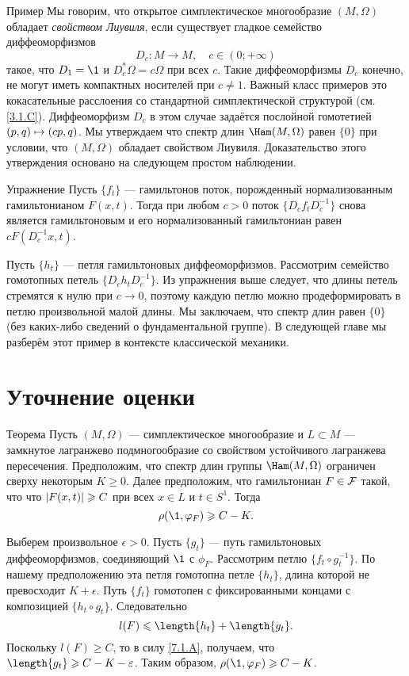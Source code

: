 \begin{ex}{Пример}\label{7.3.B}
Мы говорим, что открытое симплектическое многообразие $(M, \Omega)$
обладает \emph{свойством Лиувиля}, если
существует гладкое семейство диффеоморфизмов 
\[D_c: M \to M,\quad c \in (0; + \infty)\]
такое, что $D_1 = \1$ и $D_c^\ast \Omega = c\Omega$ при всех $c$.
Такие диффеоморфизмы $D_c$ конечно, не могут иметь компактных
носителей при $c \ne 1$. 
Важный класс примеров это кокасательные расслоения со стандартной
симплектической структурой (см. \ref{3.1.C}).
Диффеоморфизм $D_c$ в этом случае задаётся послойной гомотетией $(p,
q) \z\mapsto (cp, q)$. 
Мы утверждаем что спектр длин $\Ham (M, \Omega)$ равен $\{0\}$ при
условии, что $(M, \Omega)$ 
обладает свойством Лиувиля.
Доказательство этого утверждения основано на следующем простом наблюдении.
\end{ex}

\begin{ex*}{Упражнение}
Пусть $\{f_t\}$ — гамильтонов поток, порожденный нормализованным гамильтонианом $F (x, t)$.
Тогда при любом $c> 0$ поток $\{D_c f_t D_c^{-1}\}$ снова является
гамильтоновым и его нормализованный гамильтониан равен $cF (D_c^{-1} x, t)$.
\end{ex*}

Пусть $\{h_t\}$ — петля гамильтоновых диффеоморфизмов.
Рассмотрим семейство гомотопных петель $\{D_c h_t D_c ^{-1}\}$.
Из упражнения выше следует, что длины петель стремятся к нулю при $c \to 0$, поэтому каждую петлю можно продеформировать в петлю произвольной малой длины.
Мы заключаем, что спектр длин равен $\{0\}$ (без каких-либо сведений о фундаментальной группе).
В следующей главе мы разберём этот пример в контексте классической механики.

\section{Уточнение оценки}

\begin{thm}{Теорема}\label{7.4.A}
Пусть $(M, \Omega)$ — симплектическое многообразие и $L \subset M$
— замкнутое лагранжево подмногообразие со свойством устойчивого
лагранжева пересечения. 
Предположим, что спектр длин группы $\Ham (M, \Omega)$ ограничен
сверху некоторым $K \ge 0$. 
Далее предположим, что гамильтониан $F \in \mathcal{F}$ такой, что что $| F (x,
t) | \z\ge C$ при всех $x \in L$ и $t \in S^1$. 
Тогда 
\[\rho (\1, \phi_F) \ge C - K.\]
\end{thm}

Выберем произвольное $\epsilon> 0$. 
Пусть $\{g_t\}$ — путь гамильтоновых диффеоморфизмов, соединяющий $\1$ с $\phi_F$.
Рассмотрим петлю $\{f_t \circ g_t ^{-1}\}$.
По нашему предположению эта петля гомотопна петле $\{h_t\}$, длина которой не превосходит $K + \epsilon$.
Путь $\{f_t\}$ гомотопен с фиксированными концами с композицией $\{h_t \circ g_t\}$.
Следовательно
\[l (F) \le \length \{h_t\} + \length \{g_t\}.\]
Поскольку $l (F) \ge C$, то в силу \ref{7.1.A}, получаем, что $\length \{g_t\} \ge C \z- K - \epsilon$.
Таким образом, $\rho (\1, \phi_F) \ge C - K$.
\qeds
